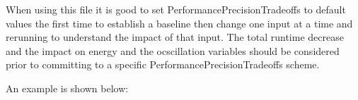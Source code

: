 When using this file it is good to set PerformancePrecisionTradeoffs to default values the first time to establish a baseline then change one input at a time and rerunning to understand the impact of that input. The total runtime decrease 
and the impact on energy and the ocscillation variables should be considered prior to committing to a specific PerformancePrecisionTradeoffs scheme.

An example is shown below:

\begin{lstlisting}

\end{lstlisting}
